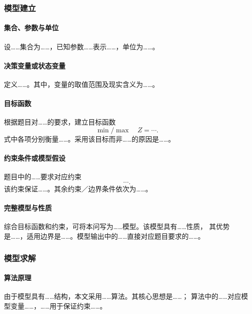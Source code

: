 \subsubsection{模型建立}


\paragraph{集合、参数与单位}
设……集合为……，已知参数……表示……，单位为……。

\paragraph{决策变量或状态变量}
定义……。其中，变量的取值范围及现实含义为……。

\paragraph{目标函数}
根据题目对……的要求，建立目标函数
\begin{equation}
    \min/\max\quad Z=\cdots .
\end{equation}
式中各项分别衡量……。采用该目标而非……的原因是……。

\paragraph{约束条件或模型假设}
题目中的……要求对应约束
\begin{equation}
    \cdots .
\end{equation}
该约束保证……。其余约束／边界条件依次为……。

\paragraph{完整模型与性质}
综合目标函数和约束，可将本问写为……模型。该模型具有……性质，
其优势是……，适用边界是……。模型输出中的……直接对应题目要求的……。

\subsubsection{模型求解}

\paragraph{算法原理}
由于模型具有……结构，本文采用……算法。其核心思想是……；
算法中的……对应模型变量……，……用于保证约束……。

